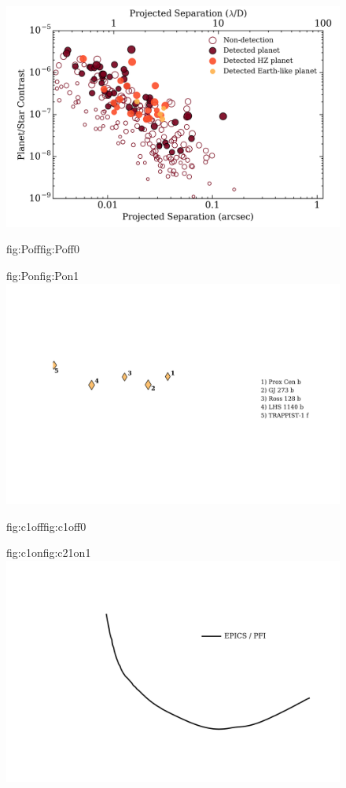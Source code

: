 \begin{figure}
  \centering
  \includegraphics[width=0.99\hsize]{figures/SPIRoudet_contrast_bkgd.png}%
  \hspace{-0.99\hsize}%
  \begin{ocg}{fig:Poff}{fig:Poff}{0}%
  \end{ocg}%
  \begin{ocg}{fig:Pon}{fig:Pon}{1}%
   \includegraphics[width=0.99\hsize]{figures/SPIRoudet_contrast_planets.png}%
  \end{ocg}
  \hspace{-0.99\hsize}%
  \begin{ocg}{fig:c1off}{fig:c1off}{0}%
  \end{ocg}%
  \begin{ocg}{fig:c1on}{fig:c21on}{1}%
   \includegraphics[width=0.99\hsize]{figures/SPIRoudet_contrast_curve1.png}%

\end{ocg}
\end{figure}
